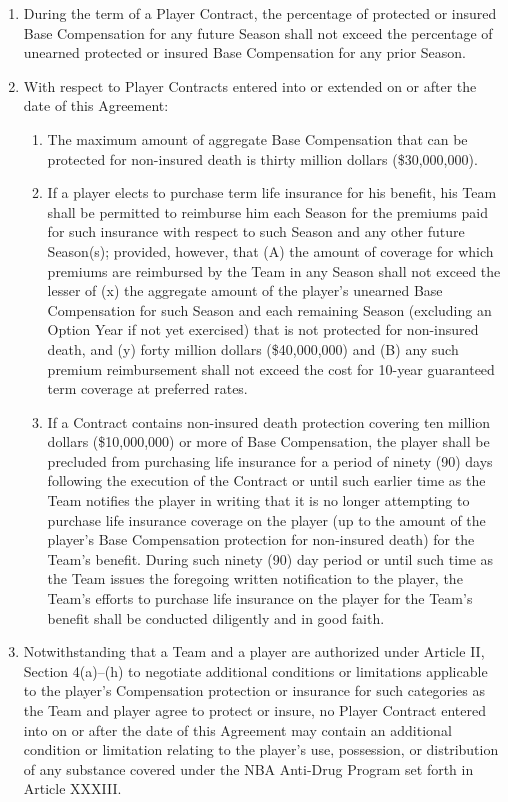 \documentclass[
]{book}
\providecommand{\tightlist}{%
  \setlength{\itemsep}{0pt}\setlength{\parskip}{0pt}}
\begin{document}
\begin{enumerate}
\item
  During the term of a Player Contract, the percentage of protected or insured Base Compensation for any future Season shall not exceed the percentage of unearned protected or insured Base Compensation for any prior Season.
\item
  With respect to Player Contracts entered into or extended on or after the date of this Agreement:

  \begin{enumerate}
  \def\labelenumii{(\roman{enumii})}
  \tightlist
  \item
    The maximum amount of aggregate Base Compensation that can be protected for non-insured death is thirty million dollars (\$30,000,000).
  \item
    If a player elects to purchase term life insurance for his benefit, his Team shall be permitted to reimburse him each Season for the premiums paid for such insurance with respect to such Season and any other future Season(s); provided, however, that (A) the amount of coverage for which premiums are reimbursed by the Team in any Season shall not exceed the lesser of (x) the aggregate amount of the player's unearned Base Compensation for such Season and each remaining Season (excluding an Option Year if not yet exercised) that is not protected for non-insured death, and (y) forty million dollars (\$40,000,000) and (B) any such premium reimbursement shall not exceed the cost for 10-year guaranteed term coverage at preferred rates.
  \item
    If a Contract contains non-insured death protection covering ten million dollars (\$10,000,000) or more of Base Compensation, the player shall be precluded from purchasing life insurance for a period of ninety (90) days following the execution of the Contract or until such earlier time as the Team notifies the player in writing that it is no longer attempting to purchase life insurance coverage on the player (up to the amount of the player's Base Compensation protection for non-insured death) for the Team's benefit. During such ninety (90) day period or until such time as the Team issues the foregoing written notification to the player, the Team's efforts to purchase life insurance on the player for the Team's benefit shall be conducted diligently and in good faith.
  \end{enumerate}
\item
  Notwithstanding that a Team and a player are authorized under Article II, Section 4(a)--(h) to negotiate additional conditions or limitations applicable to the player's Compensation protection or insurance for such categories as the Team and player agree to protect or insure, no Player Contract entered into on or after the date of this Agreement may contain an additional condition or limitation relating to the player's use, possession, or distribution of any substance covered under the NBA Anti-Drug Program set forth in Article XXXIII.
\end{enumerate}
\end{document}
